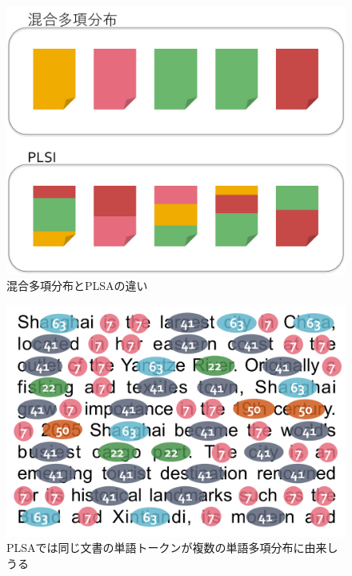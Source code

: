 \documentclass[aspectratio=169,unicode,dvipdfmx,14pt]{beamer}
\begin{document}
\begin{frame}
\begin{figure}[htbp]
\begin{center}
\includegraphics[scale=.21]{PLSI1.jpg}
\caption{混合多項分布とPLSAの違い}
\label{}
\end{center}
\end{figure}\end{frame}

\begin{frame}
\begin{figure}[htbp]
\begin{center}
\includegraphics[scale=.22]{PLSI2.jpg}
\vspace{-.2in}
\caption{PLSAでは同じ文書の単語トークンが複数の単語多項分布に由来しうる}
\label{}
\end{center}
\end{figure}
\end{frame}
\end{document}
